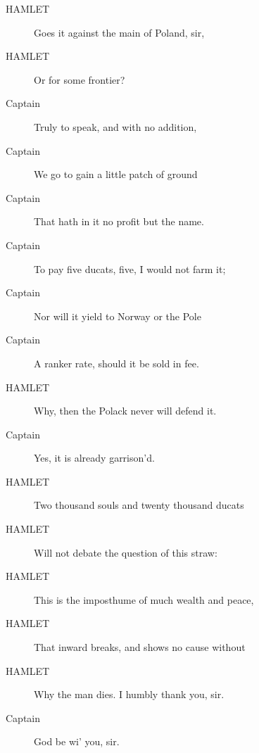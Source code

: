 \documentclass{article}
\begin{document}
\begin{description}
            
\item[HAMLET] Goes it against the main of Poland, sir,
\item[HAMLET] Or for some frontier?
\end{description}
          
\begin{description}
            
\item[Captain] Truly to speak, and with no addition,
\item[Captain] We go to gain a little patch of ground
\item[Captain] That hath in it no profit but the name.
\item[Captain] To pay five ducats, five, I would not farm it;
\item[Captain] Nor will it yield to Norway or the Pole
\item[Captain] A ranker rate, should it be sold in fee.
\end{description}
          
\begin{description}
            
\item[HAMLET] Why, then the Polack never will defend it.
\end{description}
          
\begin{description}
            
\item[Captain] Yes, it is already garrison'd.
\end{description}
          
\begin{description}
            
\item[HAMLET] Two thousand souls and twenty thousand ducats
\item[HAMLET] Will not debate the question of this straw:
\item[HAMLET] This is the imposthume of much wealth and peace,
\item[HAMLET] That inward breaks, and shows no cause without
\item[HAMLET] Why the man dies. I humbly thank you, sir.
\end{description}
          
\begin{description}
            
\item[Captain] God be wi' you, sir.
\end{description}
          
\end{document}
